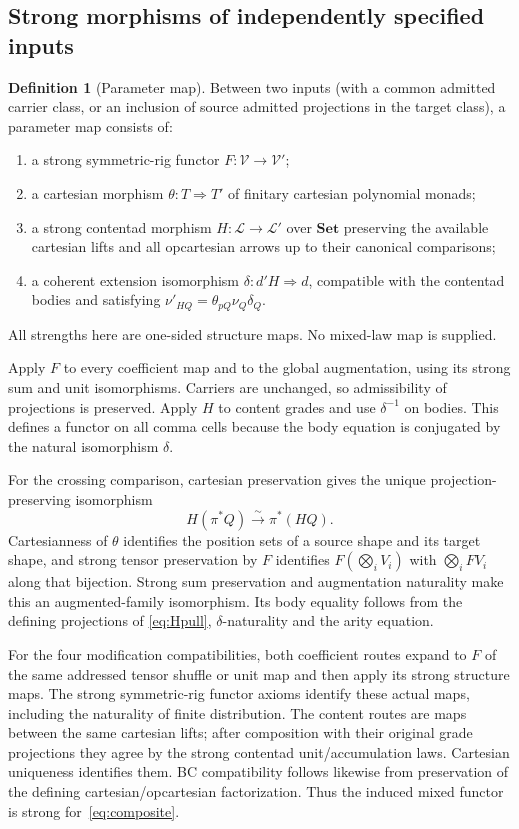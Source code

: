 \documentclass[11pt,a4paper]{article}
\theoremstyle{definition}
\newtheorem{definition}[theorem]{Definition}
\newcommand{\Set}{\mathbf{Set}}
\newcommand{\V}{\mathcal V}
\newcommand{\Lcat}{\mathcal L}
\begin{document}
\subsection{Strong morphisms of independently specified inputs}
\begin{definition}[Parameter map]\label{def:parameters}
Between two inputs (with a common admitted carrier class, or an inclusion of
source admitted projections in the target class), a parameter map consists of:
\begin{enumerate}[label=\textup{(\roman*)}]
\item a strong symmetric-rig functor $F:\V\to\V'$;
\item a cartesian morphism $\theta:T\Rightarrow T'$ of finitary cartesian
polynomial monads;
\item a strong contentad morphism $H:\Lcat\to\Lcat'$ over $\Set$ preserving
the available cartesian lifts and all opcartesian arrows up to their canonical
comparisons;
\item a coherent extension isomorphism $\delta:d'H\Rightarrow d$, compatible
with the contentad bodies and satisfying
$\nu'_{HQ}=\theta_{pQ}\nu_Q\delta_Q$.
\end{enumerate}
All strengths here are one-sided structure maps. No mixed-law map is supplied.
\end{definition}
Apply $F$ to every coefficient map and to the global augmentation, using its
strong sum and unit isomorphisms. Carriers are unchanged, so admissibility of
projections is preserved. Apply $H$ to content grades and use $\delta^{-1}$ on
bodies. This defines a functor on all comma cells because the body equation is
conjugated by the natural isomorphism $\delta$.

For the crossing comparison, cartesian preservation gives the unique
projection-preserving isomorphism
\begin{equation}\label{eq:Hpull}
 H(\pi^*Q)\xrightarrow{\sim}\pi^*(HQ).
\end{equation}
Cartesianness of $\theta$ identifies the position sets of a source shape and
its target shape, and strong tensor preservation by $F$ identifies
$F(\bigotimes_iV_i)$ with $\bigotimes_iFV_i$ along that bijection. Strong sum
preservation and augmentation naturality make this an augmented-family
isomorphism. Its body equality follows from the defining projections of
\eqref{eq:Hpull}, $\delta$-naturality and the arity equation.

For the four modification compatibilities, both coefficient routes expand to
$F$ of the same addressed tensor shuffle or unit map and then apply its strong
structure maps. The strong symmetric-rig functor axioms identify these actual
maps, including the naturality of finite distribution. The content routes are
maps between the same cartesian lifts; after composition with their original
grade projections they agree by the strong contentad unit/accumulation laws.
Cartesian uniqueness identifies them. BC compatibility follows likewise from
preservation of the defining cartesian/opcartesian factorization. Thus the
induced mixed functor is strong for~\eqref{eq:composite}.
\end{document}
